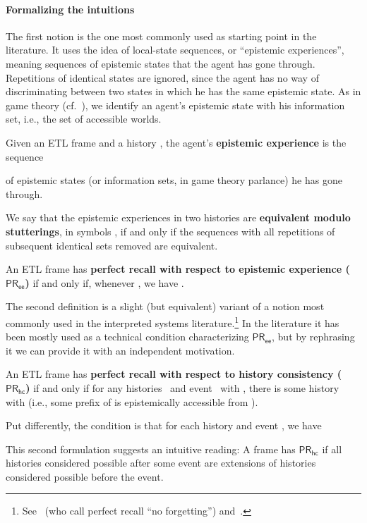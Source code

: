 \documentclass{article}
\newcommand{\PRhc}{\ensuremath{\mathsf{PR_{hc}}}\xspace}
\newcommand{\PRee}{\ensuremath{\mathsf{PR_{ee}}}\xspace}
\def\dfn{\textbf}
\newcommand{\tiff}{if and only if\xspace}
\newcounter{#1}
\begin{document}
\paragraph{Formalizing the intuitions}
\label{sec:form-intu}

The first notion is the one most commonly used as starting point in the literature.
It uses the idea of local-state sequences, or ``epistemic experiences'',
meaning sequences of epistemic states that the agent has gone through.
Repetitions of identical states are ignored,
since the agent has no way of discriminating between two states in which he has the same epistemic state.
As in game theory (cf.~\cite[Section~11.1.3]{osborne_course_1994}),
we identify an agent's epistemic state with his information set,
i.e., the set of accessible worlds.

\begin{definition}
  \label{dfn:pr-ee}
  Given an ETL frame and a history ,
  the agent's \dfn{epistemic experience} is the sequence
  
  of epistemic states (or information sets, in game theory parlance) he has gone through.

  We say that the epistemic experiences in two histories  are \dfn{equivalent modulo stutterings},
  in symbols ,
  \tiff the sequences with all repetitions of subsequent identical sets removed
  are equivalent.

  An ETL frame has \dfn{perfect recall with respect to epistemic experience (\PRee)} \tiff,
  whenever , we have .
\end{definition}

The second definition is a slight (but equivalent) variant of a notion
most commonly used in the interpreted systems literature.\footnote{See~\cite[p.~204]{halpern_complexity_1989} (who call perfect recall ``no forgetting'')
and~\cite[Proposition~2.1(a)]{van_der_meyden_axioms_1993}.}
In the literature it has been mostly used as a technical condition characterizing \PRee,
but by rephrasing it we can provide it with an independent motivation.
\begin{definition}
  \label{dfn:pr-hc}
  An ETL frame has \dfn{perfect recall with respect to history consistency (\PRhc)} \tiff
  for any histories~ and event~ with ,
  there is some history  with 
  (i.e., some prefix of  is epistemically accessible from ).

  Put differently, the condition is that for each history  and event , we have
  
\end{definition}
This second formulation suggests an intuitive reading:
A frame has \PRhc if all histories considered possible after some event
are extensions of histories considered possible before the event.
\end{document}
